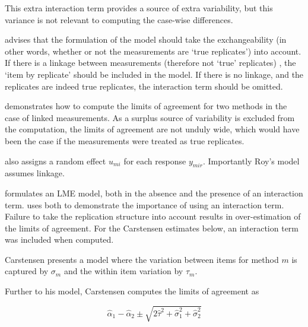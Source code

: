 \documentclass[12pt, a4paper]{report}
\theoremstyle{plain}
\theoremstyle{definition}
\theoremstyle{remark}
\begin{document}
This extra interaction term provides a source of extra variability, but this variance is not relevant to computing the case-wise differences.

\citet{BXC2008} advises that the formulation of the model should take the exchangeability (in other words, whether or not the measurements are `true replicates') into account. If there is a linkage between measurements (therefore not `true' replicates) , the `item by replicate' should be included in the model. If there is no linkage, and the replicates are indeed true replicates, the interaction term should be omitted.

\citet{BXC2008} demonstrates how to compute the limits of agreement for two methods in the case of linked measurements. As a surplus source of variability is excluded from the computation, the limits of agreement are not unduly wide, which would have been the case if the measurements were treated as true replicates.

\citet{Roy} also assigns a random effect $u_{mi}$ for each response $y_{mir}$. Importantly Roy's model assumes linkage.


\citet{BXC2008} formulates an LME model, both in the absence and the presence of an interaction term.\citet{bxc} uses both to demonstrate the importance of using an interaction term. Failure to take the replication structure into
account results in over-estimation of the limits of agreement. For the Carstensen estimates below, an interaction term was included when computed.



Carstensen presents a model where the variation between items for
method $m$ is captured by $\sigma_m$ and the within item variation
by $\tau_m$.

Further to his model, Carstensen computes the limits of agreement
as

\[
\hat{\alpha}_1 - \hat{\alpha}_2 \pm \sqrt{2 \hat{\tau}^2 +
	\hat{\sigma}^2_1 + \hat{\sigma}^2_2}
\]







\end{document}
